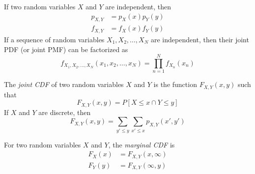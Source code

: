 If two random variables $X$ and $Y$ are independent,
then
\begin{align}
    p_{X,Y}  & = p_X(x)p_Y(y) \\
    f_{X, Y} & = f_X(x)f_Y(y)
\end{align}
If a sequence of random variables
$X_1, X_2, \dots, X_N$ are independent,
then their joint PDF (or joint PMF) can be
factorized as
\begin{equation}
    f_{X_1,X_2,\dots,X_N}\left(x_1,x_2,\dots,x_N\right) = \prod_{n=1}^{N}f_{X_n}(x_n)
\end{equation}

The \emph{joint CDF} of two random variables
$X$ and $Y$ is the function $F_{X,Y}(x,y)$ such
that
\begin{equation}
    F_{X,Y}(x,y) = P\left[X \leq x \cap Y \leq y\right]
\end{equation}
If $X$ and $Y$ are discrete, then
\begin{equation}
    F_{X,Y}(x,y) = \sum_{y'\leq y}\sum_{x' \leq x} p_{X,Y}(x',y')
\end{equation}

For two random variables $X$ and $Y$,
the \emph{marginal CDF} is
\begin{align}
    F_X(x) & = F_{X,Y}(x, \infty) \\
    F_Y(y) & = F_{X,Y}(\infty, y)
\end{align}

